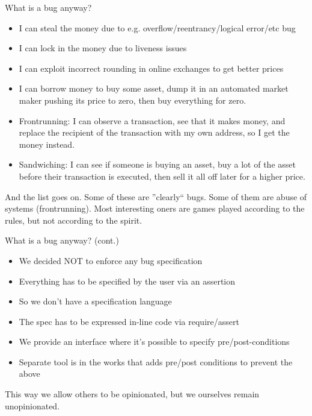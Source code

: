\documentclass[aspectratio=169]{beamer}
\begin{document}
\begin{frame}{What is a bug anyway?}
\begin{itemize}
    \item I can steal the money due to e.g. overflow/reentrancy/logical error/etc bug
    \item I can lock in the money due to liveness issues
    \item I can exploit incorrect rounding in online exchanges to get better prices
    \item I can borrow money to buy some asset, dump it in an automated market maker pushing its price to zero, then buy everything for zero.
    \item Frontrunning: I can observe a transaction, see that it makes money, and replace the recipient of the transaction with my own address, so I get the money instead.
    \item Sandwiching: I can see if someone is buying an asset, buy a lot of the asset before their transaction is executed, then sell it all off later for a higher price.
\end{itemize}

\bigskip
And the list goes on. Some of these are ''clearly`` bugs. Some of them are abuse of systems (frontrunning). Most interesting oners are games played according to the rules, but not according to the spirit.
\end{frame}

\begin{frame}{What is a bug anyway? (cont.)}
\begin{itemize}
    \item We decided NOT to enforce any bug specification
    \item Everything has to be specified by the user via an assertion
    \item So we don't have a specification language
    \item The spec has to be expressed in-line code via require/assert
    \item We provide an interface where it's possible to specify pre/post-conditions
    \item Separate tool is in the works that adds pre/post conditions to prevent the above
\end{itemize}

\bigskip
This way we allow others to be opinionated, but we ourselves remain unopinionated.
\end{frame}
\end{document}
